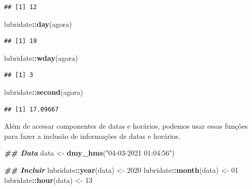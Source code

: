 \documentclass[
]{article}
\newenvironment{Shaded}{\begin{snugshade}}{\end{snugshade}}
\newcommand{\DecValTok}[1]{\textcolor[rgb]{0.00,0.00,0.81}{#1}}
\newcommand{\DocumentationTok}[1]{\textcolor[rgb]{0.56,0.35,0.01}{\textbf{\textit{#1}}}}
\newcommand{\FunctionTok}[1]{\textcolor[rgb]{0.13,0.29,0.53}{\textbf{#1}}}
\newcommand{\NormalTok}[1]{#1}
\newcommand{\OtherTok}[1]{\textcolor[rgb]{0.56,0.35,0.01}{#1}}
\newcommand{\SpecialCharTok}[1]{\textcolor[rgb]{0.81,0.36,0.00}{\textbf{#1}}}
\newcommand{\StringTok}[1]{\textcolor[rgb]{0.31,0.60,0.02}{#1}}
\begin{document}
\begin{verbatim}
## [1] 12
\end{verbatim}

\begin{Shaded}
\begin{Highlighting}[]
\NormalTok{lubridate}\SpecialCharTok{::}\FunctionTok{day}\NormalTok{(agora)}
\end{Highlighting}
\end{Shaded}

\begin{verbatim}
## [1] 19
\end{verbatim}

\begin{Shaded}
\begin{Highlighting}[]
\NormalTok{lubridate}\SpecialCharTok{::}\FunctionTok{wday}\NormalTok{(agora)}
\end{Highlighting}
\end{Shaded}

\begin{verbatim}
## [1] 3
\end{verbatim}

\begin{Shaded}
\begin{Highlighting}[]
\NormalTok{lubridate}\SpecialCharTok{::}\FunctionTok{second}\NormalTok{(agora)}
\end{Highlighting}
\end{Shaded}

\begin{verbatim}
## [1] 17.09667
\end{verbatim}

Além de acessar componentes de datas e horários, podemos usar essas funções para fazer a inclusão de informações de datas e horários.

\begin{Shaded}
\begin{Highlighting}[]
\DocumentationTok{\#\# Data}
\NormalTok{data }\OtherTok{\textless{}{-}} \FunctionTok{dmy\_hms}\NormalTok{(}\StringTok{"04{-}03{-}2021 01:04:56"}\NormalTok{)}

\DocumentationTok{\#\# Incluir}
\NormalTok{lubridate}\SpecialCharTok{::}\FunctionTok{year}\NormalTok{(data) }\OtherTok{\textless{}{-}} \DecValTok{2020}
\NormalTok{lubridate}\SpecialCharTok{::}\FunctionTok{month}\NormalTok{(data) }\OtherTok{\textless{}{-}} \DecValTok{01}
\NormalTok{lubridate}\SpecialCharTok{::}\FunctionTok{hour}\NormalTok{(data) }\OtherTok{\textless{}{-}} \DecValTok{13}
\end{Highlighting}
\end{Shaded}
\end{document}

